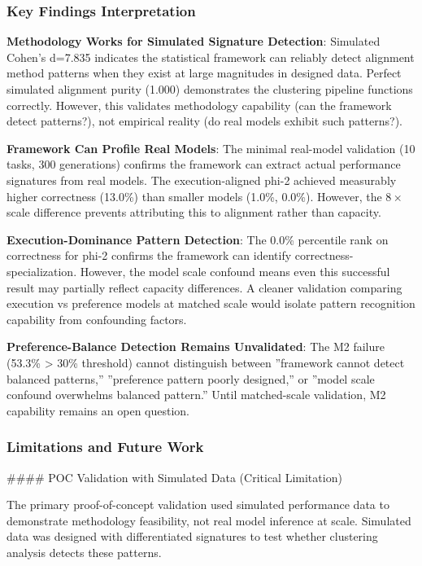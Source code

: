 
\subsubsection{Key Findings Interpretation}

\textbf{Methodology Works for Simulated Signature Detection}: Simulated Cohen's d=7.835 indicates the statistical framework can reliably detect alignment method patterns when they exist at large magnitudes in designed data. Perfect simulated alignment purity (1.000) demonstrates the clustering pipeline functions correctly. However, this validates methodology capability (can the framework detect patterns?), not empirical reality (do real models exhibit such patterns?).

\textbf{Framework Can Profile Real Models}: The minimal real-model validation (10 tasks, 300 generations) confirms the framework can extract actual performance signatures from real models. The execution-aligned phi-2 achieved measurably higher correctness (13.0\%) than smaller models (1.0\%, 0.0\%). However, the $8\times$ scale difference prevents attributing this to alignment rather than capacity.

\textbf{Execution-Dominance Pattern Detection}: The 0.0\% percentile rank on correctness for phi-2 confirms the framework can identify correctness-specialization. However, the model scale confound means even this successful result may partially reflect capacity differences. A cleaner validation comparing execution vs preference models at matched scale would isolate pattern recognition capability from confounding factors.

\textbf{Preference-Balance Detection Remains Unvalidated}: The M2 failure (53.3\% > 30\% threshold) cannot distinguish between ''framework cannot detect balanced patterns,'' ''preference pattern poorly designed,'' or ''model scale confound overwhelms balanced pattern.'' Until matched-scale validation, M2 capability remains an open question.

\subsubsection{Limitations and Future Work}

\#\#\#\# POC Validation with Simulated Data (Critical Limitation)

The primary proof-of-concept validation used simulated performance data to demonstrate methodology feasibility, not real model inference at scale. Simulated data was designed with differentiated signatures to test whether clustering analysis detects these patterns.


